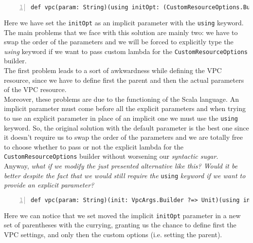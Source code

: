 \begin{minipage}{\linewidth}
\begin{lstlisting}[numbers=left, numberstyle=\tiny, numbersep=-5pt, stepnumber=1]
  def vpc(param: String)(using initOpt: (CustomResourceOptions.Builder ?=> Unit), init: VpcArgs.Builder ?=> Unit) : etc.
\end{lstlisting}
\end{minipage}
Here we have set the \texttt{initOpt} as an implicit parameter with the \texttt{using} keyword.
The main problems that we face with this solution are mainly two: we have to swap the order of the parameters and we will be forced to explicitly type the \textit{using} keyword if we want to pass custom lambda for the \texttt{CustomResourceOptions} builder.\\
The first problem leads to a sort of awkwardness while defining the VPC resource, since we have to define first the parent and then the actual parameters of the VPC resource.\\
Moreover, these problems are due to the functioning of the Scala language.
An implicit parameter must come before all the explicit parameters and when trying to use an explicit parameter in place of an implicit one we must use the \texttt{using} keyword.
So, the original solution with the default parameter is the best one since it doesn't require us to swap the order of the parameters and we are totally free to choose whether to pass or not the explicit lambda for the \texttt{CustomResourceOptions} builder without worsening our \textit{syntactic sugar}.\\
Anyway, \textit{what if we modify the just presented alternative like this? Would it be better despite the fact that we would still require the} \texttt{using} \textit{keyword if we want to provide an explicit parameter?}\\
\begin{minipage}{\linewidth}
  \begin{lstlisting}[numbers=left, numberstyle=\tiny, numbersep=-5pt, stepnumber=1]
    def vpc(param: String)(init: VpcArgs.Builder ?=> Unit)(using initOpt: CustomResourceOptions.Builder ?=> Unit) : etc.
  \end{lstlisting}
\end{minipage}
Here we can notice that we set moved the implicit \texttt{initOpt} parameter in a new set of parentheses with the currying, granting us the chance to define first the VPC settings, and only then the custom options (i.e. setting the parent).
